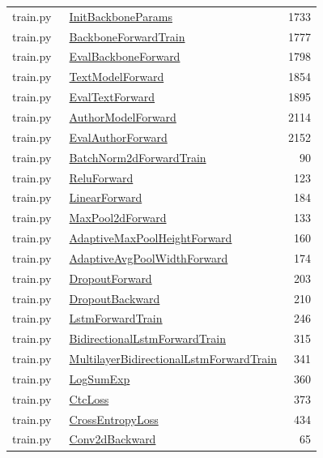 \documentclass[11pt,a4paper,oneside]{report}
\begin{document}
\begin{longtable}{p{0.28\linewidth}p{0.48\linewidth}r}
train.py & \hyperref[fn:train:InitBackboneParams]{InitBackboneParams} & 1733\\
train.py & \hyperref[fn:train:BackboneForwardTrain]{BackboneForwardTrain} & 1777\\
train.py & \hyperref[fn:train:EvalBackboneForward]{EvalBackboneForward} & 1798\\
train.py & \hyperref[fn:train:TextModelForward]{TextModelForward} & 1854\\
train.py & \hyperref[fn:train:EvalTextForward]{EvalTextForward} & 1895\\
train.py & \hyperref[fn:train:AuthorModelForward]{AuthorModelForward} & 2114\\
train.py & \hyperref[fn:train:EvalAuthorForward]{EvalAuthorForward} & 2152\\
train.py & \hyperref[fn:train:BatchNorm2dForwardTrain]{BatchNorm2dForwardTrain} & 90\\
train.py & \hyperref[fn:train:ReluForward]{ReluForward} & 123\\
train.py & \hyperref[fn:train:LinearForward]{LinearForward} & 184\\
train.py & \hyperref[fn:train:MaxPool2dForward]{MaxPool2dForward} & 133\\
train.py & \hyperref[fn:train:AdaptiveMaxPoolHeightForward]{AdaptiveMaxPoolHeightForward} & 160\\
train.py & \hyperref[fn:train:AdaptiveAvgPoolWidthForward]{AdaptiveAvgPoolWidthForward} & 174\\
train.py & \hyperref[fn:train:DropoutForward]{DropoutForward} & 203\\
train.py & \hyperref[fn:train:DropoutBackward]{DropoutBackward} & 210\\
train.py & \hyperref[fn:train:LstmForwardTrain]{LstmForwardTrain} & 246\\
train.py & \hyperref[fn:train:BidirectionalLstmForwardTrain]{BidirectionalLstmForwardTrain} & 315\\
train.py & \hyperref[fn:train:MultilayerBidirectionalLstmForwardTrain]{MultilayerBidirectionalLstmForwardTrain} & 341\\
train.py & \hyperref[fn:train:LogSumExp]{LogSumExp} & 360\\
train.py & \hyperref[fn:train:CtcLoss]{CtcLoss} & 373\\
train.py & \hyperref[fn:train:CrossEntropyLoss]{CrossEntropyLoss} & 434\\
train.py & \hyperref[fn:train:Conv2dBackward]{Conv2dBackward} & 65\\

\end{longtable}
\end{document}
